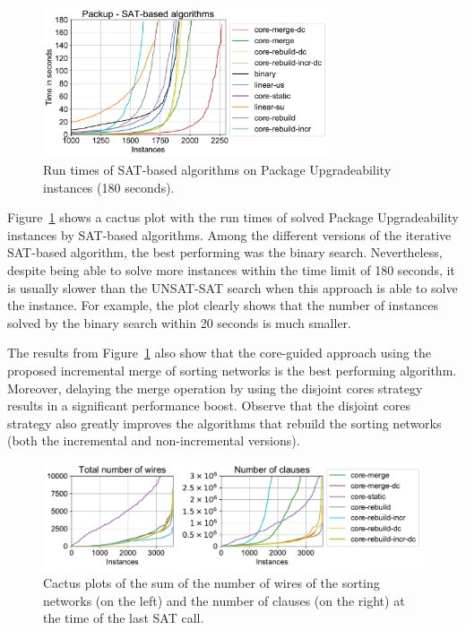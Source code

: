 \documentclass[a4paper,UKenglish,cleveref, autoref, thm-restate]{lipics-v2021}
\begin{document}
\begin{figure}[t]
  \begin{centering}
    \includegraphics[width=0.75\textwidth]{images/package_upgradeability/run_times_packup.pdf}
    \caption{Run times of SAT-based algorithms on Package Upgradeability instances (180 seconds).}
    \label{fig:run-times-packup}
  \end{centering}
\end{figure}

Figure~\ref{fig:run-times-packup} shows a cactus plot with the run times of solved Package Upgradeability instances by SAT-based algorithms.
Among the different versions of the iterative SAT-based algorithm, the best performing was the binary search. Nevertheless, despite being able to solve more instances within the time limit of 180 seconds, it is usually slower than the UNSAT-SAT search when this approach is able to solve the instance. For example, the plot clearly shows that the number of instances solved by the binary search within 20 seconds is much smaller.

The results from Figure~\ref{fig:run-times-packup} also show that the core-guided approach using the proposed incremental merge of sorting networks is the best performing algorithm. Moreover, delaying the merge operation by using the disjoint cores strategy results in a significant performance boost. Observe that the disjoint cores strategy also greatly improves the algorithms that rebuild the sorting networks (both the incremental and non-incremental versions). 

\begin{figure}[t]
  \centering
  \includegraphics[width=1\linewidth]{images/package_upgradeability/snet_info.pdf}
  \caption{Cactus plots of the sum of the number of wires of the sorting networks (on the left) and the number of clauses (on the right) at the time of the last SAT call.}
  \label{fig:wires_clauses}
\end{figure}
\end{document}
